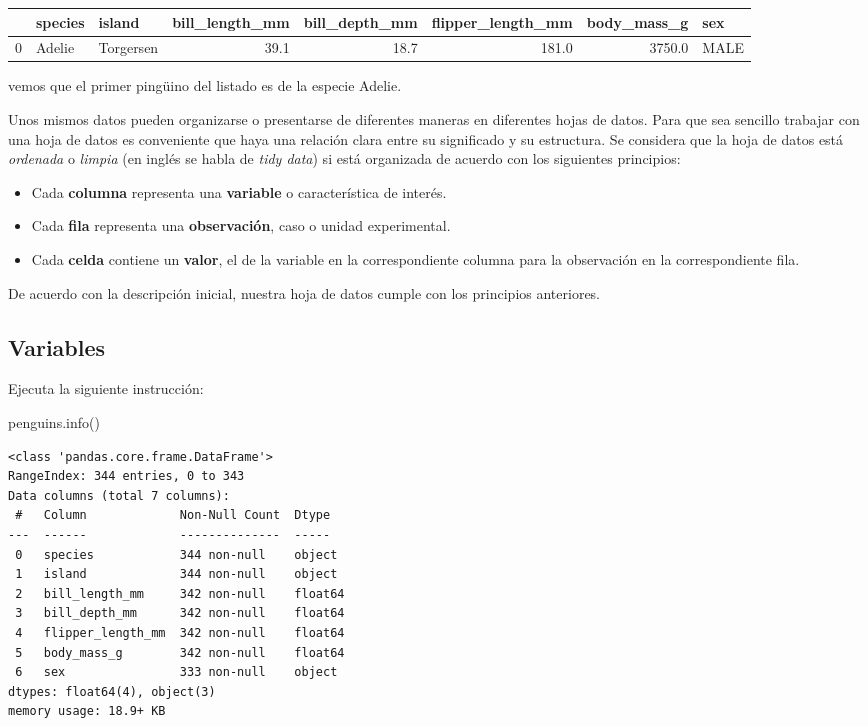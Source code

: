 \documentclass[
  a4paper,
  noprof,
  12pt,
  notoc,
  nosols,
  nobib]{mnye}
\newenvironment{Shaded}{\begin{snugshade}}{\end{snugshade}}
\newcommand{\NormalTok}[1]{\textcolor[rgb]{0.00,0.23,0.31}{#1}}
\providecommand{\tightlist}{%
  \setlength{\itemsep}{0pt}\setlength{\parskip}{0pt}}\usepackage{longtable,booktabs,array}
\theoremstyle{definition}
\theoremstyle{remark}
\begin{document}
\begin{tabular}{lllrrrrl}
\toprule
{} & species &     island &  bill\_length\_mm &  bill\_depth\_mm &  flipper\_length\_mm &  body\_mass\_g &   sex \\
\midrule
0 &  Adelie &  Torgersen &            39.1 &           18.7 &              181.0 &       3750.0 &  MALE \\
\bottomrule
\end{tabular}

vemos que el primer pingüino del listado es de la especie Adelie.

Unos mismos datos pueden organizarse o presentarse de diferentes maneras
en diferentes hojas de datos. Para que sea sencillo trabajar con una
hoja de datos es conveniente que haya una relación clara entre su
significado y su estructura. Se considera que la hoja de datos está
\emph{ordenada} o \emph{limpia} (en inglés se habla de \emph{tidy data})
si está organizada de acuerdo con los siguientes principios:

\begin{itemize}
\tightlist
\item
  Cada \textbf{columna} representa una \textbf{variable} o
  característica de interés.
\item
  Cada \textbf{fila} representa una \textbf{observación}, caso o unidad
  experimental.
\item
  Cada \textbf{celda} contiene un \textbf{valor}, el de la variable en
  la correspondiente columna para la observación en la correspondiente
  fila.
\end{itemize}

De acuerdo con la descripción inicial, nuestra hoja de datos cumple con
los principios anteriores.

\hypertarget{variables}{%
\subsection{Variables}\label{variables}}

Ejecuta la siguiente instrucción:

\begin{Shaded}
\begin{Highlighting}[]
\NormalTok{penguins.info()}
\end{Highlighting}
\end{Shaded}

\begin{verbatim}
<class 'pandas.core.frame.DataFrame'>
RangeIndex: 344 entries, 0 to 343
Data columns (total 7 columns):
 #   Column             Non-Null Count  Dtype  
---  ------             --------------  -----  
 0   species            344 non-null    object 
 1   island             344 non-null    object 
 2   bill_length_mm     342 non-null    float64
 3   bill_depth_mm      342 non-null    float64
 4   flipper_length_mm  342 non-null    float64
 5   body_mass_g        342 non-null    float64
 6   sex                333 non-null    object 
dtypes: float64(4), object(3)
memory usage: 18.9+ KB
\end{verbatim}
\end{document}
